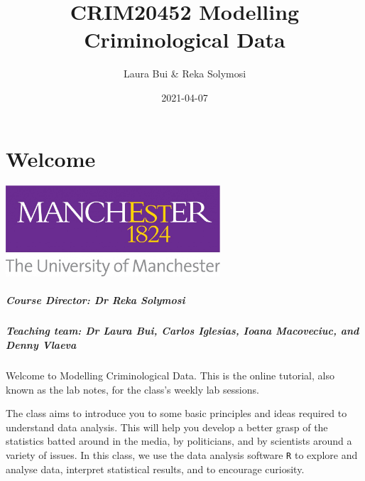 \documentclass[
]{book}
\title{CRIM20452 Modelling Criminological Data}
\author{Laura Bui \& Reka Solymosi}
\date{2021-04-07}
\begin{document}
\maketitle

{
\setcounter{tocdepth}{1}
\tableofcontents
}
\hypertarget{welcome}{%
\chapter*{Welcome}\label{welcome}}

\includegraphics[width=0.6\textwidth,height=\textheight]{Images/UOM.jpg}

\hypertarget{course-director-dr-reka-solymosi}{%
\paragraph*{Course Director: Dr Reka Solymosi}\label{course-director-dr-reka-solymosi}}

\hypertarget{teaching-team-dr-laura-bui-carlos-iglesias-ioana-macoveciuc-and-denny-vlaeva}{%
\paragraph*{Teaching team: Dr Laura Bui, Carlos Iglesias, Ioana Macoveciuc, and Denny Vlaeva}\label{teaching-team-dr-laura-bui-carlos-iglesias-ioana-macoveciuc-and-denny-vlaeva}}

Welcome to Modelling Criminological Data. This is the online tutorial, also known as the lab notes, for the class's weekly lab sessions.

The class aims to introduce you to some basic principles and ideas required to understand data analysis. This will help you develop a better grasp of the statistics batted around in the media, by politicians, and by scientists around a variety of issues. In this class, we use the data analysis software \texttt{R} to explore and analyse data, interpret statistical results, and to encourage curiosity.
\end{document}
